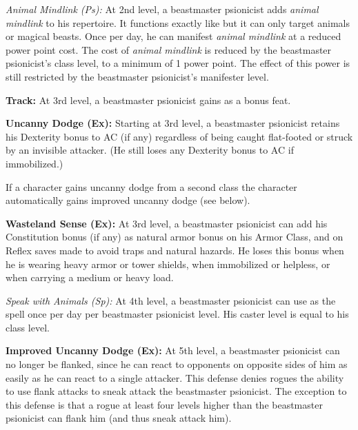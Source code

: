 {\textit{Animal Mindlink (Ps):} At 2nd level, a beastmaster psionicist adds \emph{animal mindlink} to his repertoire. It functions exactly like  but it can only target animals or magical beasts. Once per day, he can manifest \emph{animal mindlink} at a reduced power point cost. The cost of \emph{animal mindlink} is reduced by the beastmaster psionicist's class level, to a minimum of 1 power point. The effect of this power is still restricted by the beastmaster psionicist's manifester level.

\textbf{Track:} At 3rd level, a beastmaster psionicist gains  as a bonus feat.

\textbf{Uncanny Dodge (Ex):} Starting at 3rd level, a beastmaster psionicist retains his Dexterity bonus to AC (if any) regardless of being caught flat-footed or struck by an invisible attacker. (He still loses any Dexterity bonus to AC if immobilized.)

If a character gains uncanny dodge from a second class the character automatically gains improved uncanny dodge (see below).

\textbf{Wasteland Sense (Ex):} At 3rd level, a beastmaster psionicist can add his Constitution bonus (if any) as natural armor bonus on his Armor Class, and on Reflex saves made to avoid traps and natural hazards. He loses this bonus when he is wearing heavy armor or tower shields, when immobilized or helpless, or when carrying a medium or heavy load.



\textit{Speak with Animals (Sp):} At 4th level, a beastmaster psionicist can use  as the spell once per day per beastmaster psionicist level. His caster level is equal to his class level.

\textbf{Improved Uncanny Dodge (Ex):} At 5th level, a beastmaster psionicist can no longer be flanked, since he can react to opponents on opposite sides of him as easily as he can react to a single attacker. This defense denies rogues the ability to use flank attacks to sneak attack the beastmaster psionicist. The exception to this defense is that a rogue at least four levels higher than the beastmaster psionicist can flank him (and thus sneak attack him).

}
